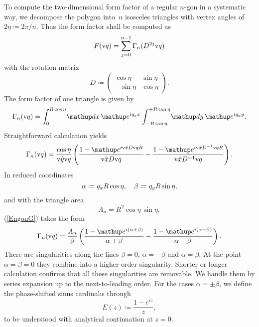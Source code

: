 To compute the two-dimensional form factor
of a regular $n$-gon in a systematic way,
we decompose the polygon into~$n$ isosceles triangles
with vertex angles of $2\eta\coloneqq2\pi/n$.
Thus the form factor shall be computed as
\begin{equation}
  F(\text{v}{q}) = \sum_{j=0}^{n-1} \Gamma_n(D^{2j}\text{v}{q})
\end{equation}
with the rotation matrix
\begin{equation}
  D\coloneqq\left(\begin{array}{ll}\cos\eta&\sin\eta\\
                          -\sin\eta&\cos\eta\end{array}\right).
\end{equation}
The form factor of one triangle is given by
\begin{equation}
  \Gamma_n(\q)
  =\int_0^{R\cos\eta}\!\d x\,\e^{iq_x x}
   \int_{-R\tan\eta}^{+R\tan\eta}\!\d y\,\e^{iq_yy}.
\end{equation}
Straightforward calculation yields
\begin{equation}\label{EngonG}
  \Gamma_n(\q)
  = \frac{\cos\eta}{\hy\q}\left(
    \frac{1-\e^{i\hx D\q R}}{\hx D\q}
   -\frac{1-\e^{i\hx D^{-1}\q R}}{\hx D^{-1}\q}\right).
\end{equation}
In reduced coordinates
\begin{equation}
    \alpha\coloneqq q_x R\cos\eta,\quad
    \beta\coloneqq q_y R\sin\eta,
\end{equation}
and with the triangle area
\begin{equation}
  A_n = R^2 \cos\eta\,\sin\eta,
\end{equation}
(\ref{EngonG}) takes the form
\begin{equation}\label{EngonG2}
  \Gamma_n(\q) =
    \frac{A_n}{\tqy}\left(
    \frac{1-\e^{i(\tqx+\tqy)}}{\tqx+\tqy}
   -\frac{1-\e^{i(\tqx-\tqy)}}{\tqx-\tqy}\right).
\end{equation}
There are singularities along the lines
$\beta=0$, $\alpha=-\beta$ and $\alpha=\beta$.
At the point $\alpha=\beta=0$ they combine into a higher-order singularity.
Shorter or longer calculation confirms
that all these singularities are removable.
We handle them by series expansion up to the next-to-leading order.
For the cases $\alpha=\pm\beta$,
we define the phase-shifted sinus cardinalis through
\begin{equation}
  E(z)\coloneqq\frac{1-e^{iz}}{z},
\end{equation}
to be understood with analytical continuation at $z=0$.
